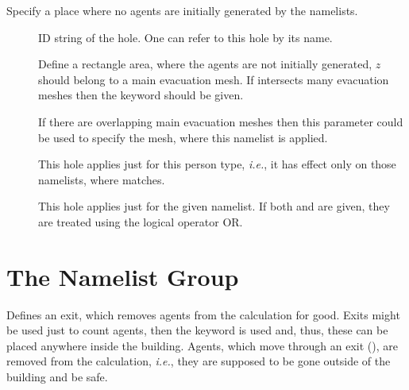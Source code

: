 \documentclass[12pt,a4paper,final,twoside]{stylevk}
\begin{document}
\noindent Specify a place where no agents are initially generated by the
 namelists.
%
\begin{description}
%
\item[] ID string of the hole.  One can refer to this hole
  by its name.
%
\item[] Define a rectangle area, where the agents are not initially generated,
  $z$ should belong to a main evacuation mesh.  If 
  intersects many evacuation meshes then the keyword 
  should be given.
%
\item[] If there are overlapping main evacuation
  meshes then this parameter could be used to specify the mesh, where
  this  namelist is applied.
%
\item[] This hole applies just for this person type,
  \emph{i.e.}, it has effect only on those  namelists,
  where  matches.
%
\item[] This hole applies just for the given 
  namelist.  If both  and  are given, they
  are treated using the logical operator OR.
%
\end{description}


\section{The  Namelist Group}\label{Sec_ExitNML}

\noindent Defines an exit, which removes agents from the calculation
for good.  Exits might be used just to count agents, then the keyword
  is used and, thus, these can be placed
anywhere inside the building.  Agents, which move through an exit
(), are removed from the calculation,
\emph{i.e.}, they are supposed to be gone outside of the building and
be safe.
\end{document}
